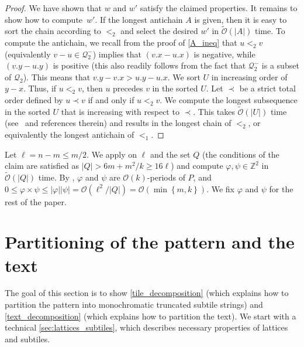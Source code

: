 \documentclass[twoside,leqno]{article}
\newcommand{\Z}{\mathbb{Z}}
\renewcommand{\O}{\mathcal{O}}
\newcommand{\tO}{\tilde{\mathcal{O}}}
\newcommand{\Q}{\mathcal{Q}}
\renewcommand{\phi}{\varphi}
\newcommand{\set}[1]{\left\lbrace #1 \right\rbrace}
\newcommand{\absolute}[1]{\left\lvert#1\right\rvert}
\newcommand{\jonas}[2][]{\todo[color=green!40, #1]{\textbf{J:} #2}}
\newcommand{\jonasi}[2][]{\jonas[inline, #1]{#2}}
\begin{document}
\begin{proof}
We have shown that $w$ and $w'$ satisfy the claimed properties. 
It remains to show how to compute~$w'$. 
If the longest antichain $A$ is given, then it is easy to sort the chain according to $<_2$ and select the desired $w'$ in $\tO(\absolute{A})$ time. To compute the antichain, we recall from the proof of \cref{A_ineq} that $u <_2 v$ (equivalently $v - u \in \Q_2^-$) implies that $(v.x - u.x)$ is negative, while $(v.y - u.y)$ is positive (this also readily follows from the fact that $\Q_2^-$ is a subset of $\Q_2$). This means that $v.y - v.x > u.y - u.x$. We sort $U$ in increasing order of $y - x$. Thus, if $u <_2 v$, then $u$ precedes $v$ in the sorted $U$. 
Let $\prec$ be a strict total order defined by $u \prec v$ if and only if $u <_2 v$. We compute the longest subsequence in the sorted $U$ that is increasing with respect to $\prec$. This takes $\tO(\absolute{U})$ time (see~\cite{CROCHEMORE20101054} and references therein) and results in the longest chain of $<_2$, or equivalently the longest antichain of $<_1$.
\end{proof}

Let $\ell = n - m \le m / 2$. We apply  on $\ell$ and the set $Q$ (the conditions of the claim are satisfied as $\absolute{Q} > 6m + m^2/k \ge 16\ell$) and compute $\phi, \psi \in \Z^2$ in $\tO(\absolute{Q})$ time. By , $\phi$ and $\psi$ are $\O(k)$-periods of $P$, and $0 \le \phi \times \psi \le \absolute{\phi}\absolute{\psi} = \O(\ell^2 / \absolute{Q}) =  \O(\min\set{m, k})$. We fix $\phi$ and $\psi$ for the rest of the paper.


\section{Partitioning of the pattern and the text}
\label{sec:partition}



\jonasi{below}
\restateDefLatticeCongruency
\restateDefTile
\restateDefTruncatedTile
\restateDefSubtile
\restateDefTileString
\restateDefMonochromaticString
\restateDefActiveText
\restateObsActiveText
\restateDefPeripherality
\jonasi{above}



The goal of this section is to show \cref{tile_decomposition} (which explains how to partition the pattern into monochromatic truncated subtile strings) and \cref{text_decomposition} (which explains how to partition the text). We start with a technical \cref{sec:lattices_subtiles}, which describes necessary properties of lattices and subtiles. 
 
\end{document}
